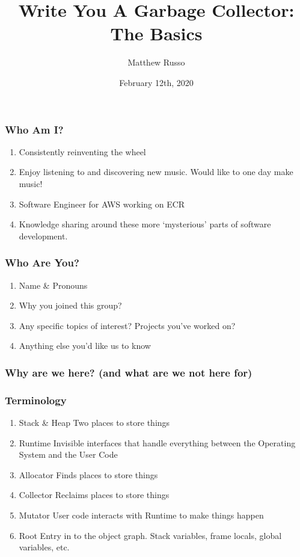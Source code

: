 \documentclass{beamer}
\title{Write You A Garbage Collector: The Basics}
\author{Matthew Russo}
\institute{Reinventing the Wheel}
\date{February 12th, 2020}
\begin{document}
 
\frame{\titlepage}

\begin{frame}
  \frametitle{Who Am I?}
  \begin{enumerate}
    \item Consistently reinventing the wheel
    \item Enjoy listening to and discovering new music. Would like to one day make music!
    \item Software Engineer for AWS working on ECR
    \item Knowledge sharing around these more `mysterious' parts of software development.
  \end{enumerate}
\end{frame}

\begin{frame}
  \frametitle{Who Are You?}
  \begin{enumerate}
    \item Name & Pronouns
    \item Why you joined this group?
    \item Any specific topics of interest? Projects you've worked on?
    \item Anything else you'd like us to know
  \end{enumerate}
\end{frame}

\begin{frame}
  \frametitle{Why are we here? (and what are we not here for)}
\end{frame}

\begin{frame}
  \frametitle{Terminology}
  \begin{enumerate}
    \item Stack & Heap \- Two places to store things
    \item Runtime \- Invisible interfaces that handle everything between the Operating System and the User Code
    \item Allocator \- Finds places to store things
    \item Collector \- Reclaims places to store things
    \item Mutator \- User code \-\- interacts with Runtime to make things happen
    \item Root \- Entry in to the object graph. Stack variables, frame locals, global variables, etc.
  \end{enumerate}
\end{frame}
\end{document}
